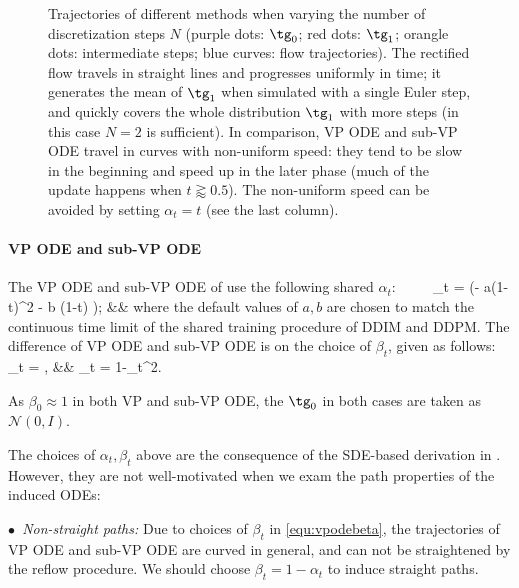 \documentclass[11pt]{article}
\newcommand{\normal}{\mathcal{N}}
\begin{document}
\begin{figure}[h]
{\begin{tabular}{c|c|c|c|c}
\end{tabular}  
}
    \caption{Trajectories of different methods when varying the number of discretization steps $N$ (purple dots: $\tg_0$; red dots: $\tg_1$; orangle dots: intermediate steps; blue curves: flow trajectories).  
    The rectified flow travels in straight lines and progresses uniformly in time; 
    it generates the mean of $\tg_1$ when simulated with a single Euler step, and quickly covers the whole distribution $\tg_1$ with more steps (in this case $N=2$ is sufficient). %
    In comparison, 
    VP ODE and sub-VP ODE travel in curves with non-uniform speed: they tend to be slow in the beginning and speed up in the later phase (much of the update happens when $t{ \scriptstyle\gtrapprox}0.5$). The non-uniform speed can be avoided by setting $\alpha_t =t $ (see the last column). 
    }
    \label{fig:speedtoy}
\end{figure}


\paragraph{VP ODE and sub-VP ODE} 
The VP ODE and sub-VP ODE 
of \cite{song2020score}
 use the following shared $\alpha_t$: 
\bbb \label{equ:vpode}
~~~~
\alpha_t = \exp\left (- a(1-t)^2 %
- b (1-t) 
\right );  && 
\eee  
where the default values of  $a,b$ are %
 chosen to match the continuous time limit of the shared training procedure of DDIM and DDPM. 
 The difference of VP ODE and sub-VP ODE is on the choice of $\beta_t$, given as follows:
\bbb \label{equ:vpodebeta} 
\beta_t = ,  &&
\beta_t = {1-\alpha_t^2}. 
\eee  

As $\beta_0 \approx 1$ in both VP and sub-VP ODE, 
the $\tg_0$ in both cases are taken as  $\normal(0,I)$. %

The choices 
of $\alpha_t,\beta_t$ 
above  are the consequence of the 
SDE-based derivation in \cite{song2020score}. %
However, 
they are not well-motivated when we exam the path properties  of the induced  
ODEs:  %



\emph{$\bullet$~Non-straight paths:} 
Due to choices of $\beta_t$ in  \eqref{equ:vpodebeta}, the trajectories of VP ODE and sub-VP ODE are curved in general,  
and can not be straightened by the reflow procedure. 
We should choose 
 $\beta_t = 1-\alpha_t$ to induce straight paths. 
\end{document}
